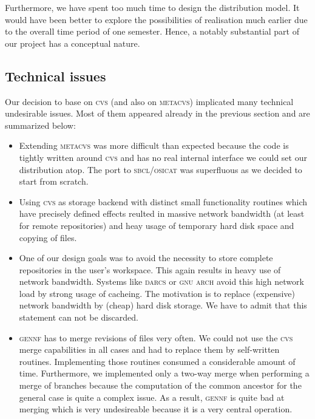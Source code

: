 \documentclass[fleqn, 10pt, a4paper]{report} \usepackage{amssymb}
\newcommand{\GENNF}{\textsc{gennf}}
\begin{document}
Furthermore, we have spent too much time to design the distribution model.
It would have been better to explore the possibilities of realisation
much earlier due to the overall time period of one semester. Hence,
a notably substantial part of our project has a conceptual nature.

\subsection{Technical issues}

Our decision to base on \textsc{cvs} (and also on \textsc{metacvs})
implicated many technical
undesirable issues. Most of them appeared already in the previous
section and are summarized below:

\begin{itemize}
\item Extending \textsc{metacvs} was more difficult than expected
  because the code is tightly written around \textsc{cvs} and has no
  real internal interface we could set our distribution atop.  The
  port to \textsc{sbcl}/\textsc{osicat} was superfluous as we decided
  to start from scratch.
\item Using \textsc{cvs} as storage backend with distinct small
  functionality routines which have precisely defined effects reulted
  in massive network bandwidth (at least for remote repositories) and
  heay usage of temporary hard disk space and copying of files.
\item One of our design goals was to avoid the necessity to store
  complete repositories in the user's workspace. This again results in
  heavy use of network bandwidth. Systems like \textsc{darcs} or
  \textsc{gnu arch} avoid this high network load by strong usage of
  cacheing. The motivation is to replace (expensive) network bandwidth
  by (cheap) hard disk storage. We have to admit that this statement
  can not be discarded.
\item \GENNF{} has to merge revisions of files very often. We could
  not use the \textsc{cvs} merge capabilities in all cases and had to
  replace them by self-written routines. Implementing those routines
  consumed a considerable amount of time.  Furthermore, we implemented
  only a two-way merge when performing a merge of branches because the
  computation of the common ancestor for the general case is quite a
  complex issue.  As a result, \GENNF{} is quite bad at merging which
  is very undesireable because it is a very central operation.
\end{itemize}
\end{document}
